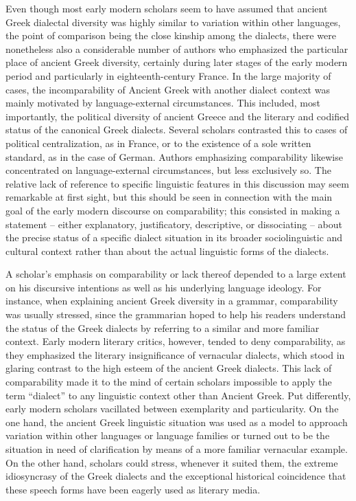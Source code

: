 Even though most early modern scholars seem to have assumed that ancient Greek dialectal diversity was highly similar to variation within other languages, the point of comparison being the close kinship among the dialects, there were nonetheless also a considerable number of authors who emphasized the particular place of ancient Greek diversity, certainly during later stages of the early modern period and particularly in eighteenth-century France. In the large majority of cases, the incomparability of Ancient Greek with another dialect context was mainly motivated by language-external circumstances. This included, most importantly, the political diversity of ancient Greece and the literary and codified status of the canonical Greek dialects. Several scholars contrasted this to cases of political centralization, as in France, or to the existence of a sole written standard, as in the case of German. Authors emphasizing comparability likewise concentrated on language-external circumstances, but less exclusively so. The relative lack of reference to specific linguistic features in this discussion may seem remarkable at first sight, but this should be seen in connection with the main goal of the early modern discourse on comparability; this consisted in making a statement – either explanatory, justificatory, descriptive, or dissociating – about the precise status of a specific dialect situation in its broader sociolinguistic and cultural context rather than about the actual linguistic forms of the dialects.

A scholar’s emphasis on comparability or lack thereof depended to a large extent on his discursive intentions as well as his underlying language ideology. For instance, when explaining ancient Greek diversity in a grammar, comparability was usually stressed, since the grammarian hoped to help his readers understand the status of the Greek dialects by referring to a similar and more familiar context. Early modern literary critics, however, tended to deny comparability, as they emphasized the literary insignificance of vernacular dialects, which stood in glaring contrast to the high esteem of the ancient Greek dialects. This lack of comparability made it to the mind of certain scholars impossible to apply the term “dialect” to any linguistic context other than Ancient Greek. Put differently, early modern scholars vacillated between exemplarity and particularity. On the one hand, the ancient Greek linguistic situation was used as a model to approach variation within other languages or language families or turned out to be the situation in need of clarification by means of a more familiar vernacular example. On the other hand, scholars could stress, whenever it suited them, the extreme idiosyncrasy of the Greek dialects and the exceptional historical coincidence that these speech forms have been eagerly used as literary media.

